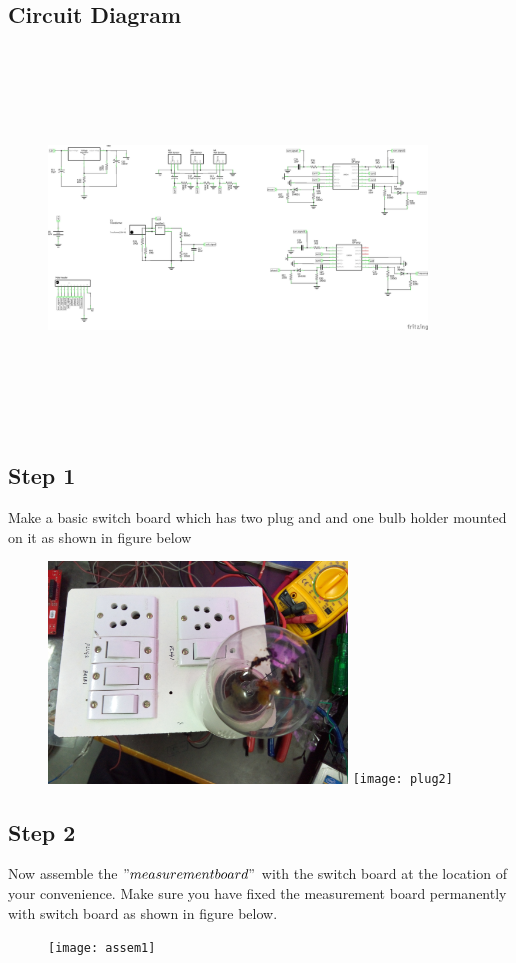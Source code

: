 \documentclass[a4paper,12pt,oneside]{book}
\begin{document}
\subsection*{Circuit Diagram}
\begin{figure}[h]
	\includegraphics[width=380px,height=380px]{schematic}
\end{figure}
\newpage
\subsection*{Step 1}
Make a basic switch board which has two plug and and one bulb holder mounted on it as 
shown in figure below
\begin{figure}[h]
	\includegraphics[width=300px]{plug1}
	\texttt{[image: plug2]}
\end{figure}
\newpage
\subsection*{Step 2}
Now assemble the $"measurement board"$ with the switch board at the location of your convenience. Make sure you have fixed the measurement board permanently with switch board as shown in figure below. 
\begin{figure}[h]
	\texttt{[image: assem1]}
\end{figure}
\end{document}

